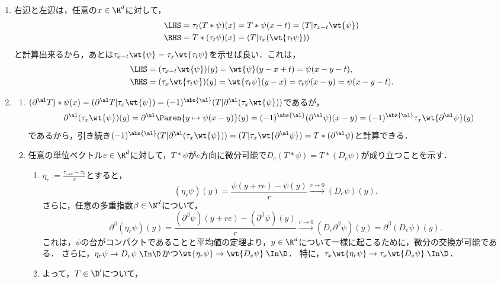 \documentclass[uplatex,dvipdfmx]{jsreport}
\begin{document}
\begin{Proof}\mbox{}
    \begin{enumerate}
        \item 右辺と左辺は，任意の$x\in\R^d$に対して，
        \begin{align*}
            \LHS&=\tau_t(T*\psi)(x)=T*\psi(x-t)=(T|\tau_{x-t}\wt{\psi})\\
            \RHS&=T*(\tau_t\psi)(x)=(T|\tau_x(\wt{\tau_t\psi}))
        \end{align*}
        と計算出来るから，あとは$\tau_{x-t}\wt{\psi}=\tau_x\wt{\tau_t\psi}$を示せば良い．これは，
        \begin{align*}
            \LHS&=(\tau_{x-t}\wt{\psi})(y)=\wt{\psi}(y-x+t)=\psi(x-y-t),\\
            \RHS&=(\tau_x\wt{\tau_t\psi})(y)=\wt{\tau_t\psi}(y-x)=\tau_t\psi(x-y)=\psi(x-y-t).
        \end{align*}
        \item \begin{enumerate}[{Step}1]
            \item $(\partial^\al T)*\psi(x)=(\partial^\al T|\tau_x\wt{\psi})=(-1)^{\abs{\al}}(T|\partial^\al(\tau_x\wt{\psi}))$であるが，
            \[\partial^\al(\tau_x\wt{\psi})(y)=\partial^\al\Paren{y\mapsto\psi(x-y)}(y)=(-1)^{\abs{\al}}(\partial^\al\psi)(x-y)=(-1)^{\abs{\al}}\tau_x\wt{\partial^\al\psi}(y)\]
            であるから，引き続き$(-1)^{\abs{\al}}(T|\partial^\al(\tau_x\wt{\psi}))=(T|\tau_x\wt{\partial^\al\psi})=T*(\partial^\al\psi)$と計算できる．
            \item 任意の単位ベクトル$e\in\R^d$に対して，$T*\psi$が$e$方向に微分可能で$D_e(T*\psi)=T*(D_e\psi)$が成り立つことを示す．
            \begin{enumerate}
                \item $\eta_r:=\frac{\tau_{-re}-\tau_0}{r}$とすると，
                \[(\eta_r\psi)(y)=\frac{\psi(y+re)-\psi(y)}{r}\xrightarrow{r\to0}(D_e\psi)(y).\]
                さらに，任意の多重指数$\beta\in\N^d$について，
                \[\partial^\beta(\eta_r\psi)(y)=\frac{(\partial^\beta\psi)(y+re)-(\partial^\beta\psi)(y)}{r}\xrightarrow{r\to0}(D_e\partial^\beta\psi)(y)=\partial^\beta(D_e\psi)(y).\]
                これは，$\psi$の台がコンパクトであることと平均値の定理より，$y\in\R^d$について一様に起こるために，微分の交換が可能である．
                さらに，$\eta_r\psi\to D_e\psi\;\In\D$かつ$\wt{\eta_r\psi}\to\wt{D_e\psi}\;\In\D$．
                特に，$\tau_x\wt{\eta_r\psi}\to\tau_x\wt{D_e\psi}\;\In\D$．
                \item よって，$T\in\D'$について，

\end{enumerate}
\end{enumerate}
\end{enumerate}
\end{Proof}
\end{document}
